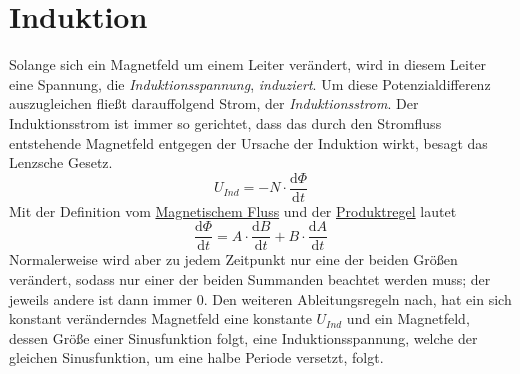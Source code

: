 \documentclass{article}
\begin{document}
 
\newcommand{\derive}[2]{\frac{\mathrm{d}#1}{\mathrm{d}#2}} 
 
\section{Induktion}  
Solange sich ein Magnetfeld um einem Leiter verändert, wird in diesem Leiter eine Spannung, die \emph{Induktionsspannung}, \emph{induziert}. \newline
Um diese Potenzialdifferenz auszugleichen fließt darauffolgend Strom, der \emph{Induktionsstrom}. Der Induktionsstrom ist immer so gerichtet, dass das  durch den Stromfluss entstehende Magnetfeld entgegen der Ursache der Induktion wirkt, besagt das Lenzsche Gesetz. 
\[
 U_{Ind} = -N \cdot \derive{\Phi}{t}
\] 
Mit der Definition vom \hyperref[Magnetischer Fluss]{Magnetischem Fluss} und der \hyperref[Ableitungsregeln]{Produktregel} lautet
\[
 \derive{\Phi}{t} = A \cdot \derive{B}{t} + B \cdot \derive{A}{t} 
\] 
Normalerweise wird aber zu jedem Zeitpunkt nur eine der beiden Größen verändert, sodass nur einer der beiden Summanden beachtet werden muss; der jeweils andere ist dann immer $0$.
Den weiteren Ableitungsregeln nach, hat ein sich konstant veränderndes Magnetfeld eine konstante $U_{Ind}$ und ein Magnetfeld, dessen Größe einer Sinusfunktion folgt, eine Induktionsspannung, welche der gleichen Sinusfunktion, um eine halbe Periode versetzt, folgt. 
\end{document}
